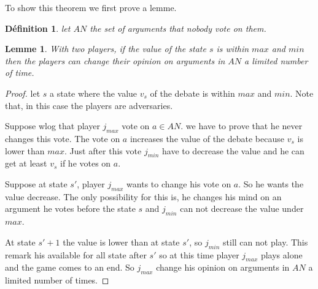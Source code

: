 \documentclass[12pt]{article}
\newtheorem{lemme}{Lemme}[section]
\theoremstyle{defi}
\newtheorem{definition}{Définition}[section]
\theoremstyle{not}
\theoremstyle{prob}
\begin{document}
      To show this theorem we first prove a lemme.
      \begin{definition}
        let $AN$ the set of arguments that nobody vote on them.
      \end{definition}
      \begin{lemme}
        \label{lem:question_5}
        With two players, if the value of the state $s$ is within $max$ and $min$ then the players can change their opinion on arguments in $AN$ a limited number of time.
      \end{lemme}
      \begin{proof}
        let $s$ a state where the value $v_s$ of the debate is within $max$ and $min$.
        Note that, in this case the players are adversaries.

        Suppose wlog that player $j_{max}$ vote on $a \in AN$. we have to prove that he never changes this vote.
        The vote on $a$ increases the value of the debate because $v_s$ is lower than $max$. Just after this vote $j_{min}$ have to decrease the value and he can get at least $v_s$ if he votes on $a$.

        Suppose at state $s'$, player $j_{max}$ wants to change his vote on $a$. So he wants the value decrease. The only possibility for this is, he changes his mind on an argument he votes before the state $s$ and $j_{min}$ can not decrease the value under $max$.

        At state $s'+1$ the value is lower than at state $s'$, so $j_{min}$ still can not play. This remark his available for all state after $s'$ so at this time player $j_{max}$ plays alone and the game comes to an end. So $j_{max}$ change his opinion on arguments in $AN$ a limited number of times.
      \end{proof}
\end{document}
